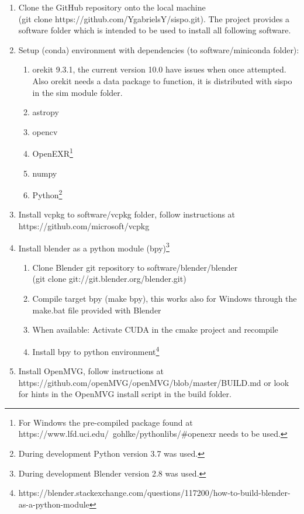 \begin{enumerate}
    \item Clone the GitHub repository onto the local machine \\ (git clone https://github.com/YgabrielsY/sispo.git). The project provides a software folder which is intended to be used to install all following software.
    \item Setup (conda) environment with dependencies (to software/miniconda folder):
    \begin{enumerate}
        \item orekit 9.3.1, the current version 10.0 have issues when once attempted. Also orekit needs a data package to function, it is distributed with \gls{sispo} in the sim module folder.
        \item astropy
        \item opencv
        \item OpenEXR\footnote{For Windows the pre-compiled package found at https://www.lfd.uci.edu/~gohlke/pythonlibs/\#openexr needs to be used.}
        \item numpy
        \item Python\footnote{During development Python version 3.7 was used.}
    \end{enumerate}{}
    \item Install vcpkg to software/vcpkg folder, follow instructions at \\ https://github.com/microsoft/vcpkg
    \item Install blender as a python module (bpy)\footnote{During development Blender version 2.8 was used.}
    \begin{enumerate}
        \item Clone Blender git repository to software/blender/blender \\ (git clone git://git.blender.org/blender.git)
        \item Compile target bpy (make bpy), this works also for Windows through the make.bat file provided with Blender
        \item When available: Activate CUDA in the cmake project and recompile
        \item Install bpy to python environment\footnote{https://blender.stackexchange.com/questions/117200/how-to-build-blender-as-a-python-module}
    \end{enumerate}{}
    \item Install OpenMVG, follow instructions at \\ https://github.com/openMVG/openMVG/blob/master/BUILD.md or look for hints in the OpenMVG install script in the build folder.

\end{enumerate}
